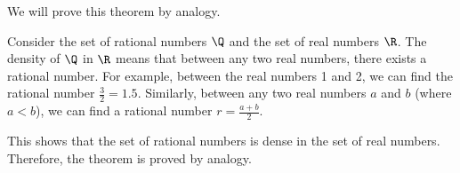 We will prove this theorem by analogy.

Consider the set of rational numbers \( \Q \) and the set of real numbers \( \R \). 
The density of \( \Q \) in \( \R \) means that between any two real numbers, there exists a 
rational number. For example, between the real numbers 1 and 2, we can find the rational 
number \( \frac{3}{2} = 1.5 \). Similarly, between any two real numbers \(a\) and \(b\) (where 
\( a < b \)), we can find a rational number \( r = \frac{a + b}{2} \).

This shows that the set of rational numbers is dense in the set of real numbers.
Therefore, the theorem is proved by analogy.

\QED

